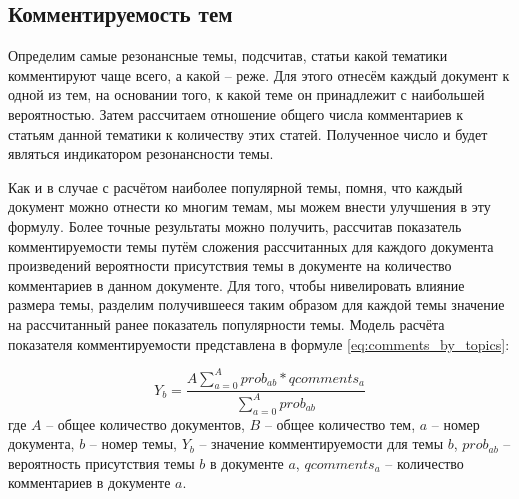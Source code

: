 \subsection{Комментируемость тем}
Определим самые резонансные темы, подсчитав, статьи какой тематики комментируют чаще всего, а какой -- реже. Для этого отнесём каждый документ к одной из тем, на основании того, к какой теме он принадлежит с наибольшей вероятностью. Затем рассчитаем отношение общего числа комментариев к статьям данной тематики к количеству этих статей. Полученное число и будет являться индикатором резонансности темы.

Как и в случае с расчётом наиболее популярной темы, помня, что каждый документ можно отнести ко многим темам, мы можем внести улучшения в эту формулу. Более точные результаты можно получить, рассчитав показатель комментируемости темы путём сложения рассчитанных для каждого документа произведений вероятности присутствия темы в документе на количество комментариев в данном документе. Для того, чтобы нивелировать влияние размера темы, разделим получившееся таким образом для каждой темы значение на рассчитанный ранее показатель популярности темы. Модель расчёта показателя комментируемости представлена в формуле \ref{eq:comments_by_topics}:

\begin{equation}\label{eq:comments_by_topics}
Y_b = \frac{A \sum \limits_{a=0}^{A}prob_{ab} * qcomments_a}{\sum_{a=0}^{A} prob_{ab}}
\end{equation}
где $A$ -- общее количество документов, $B$ -- общее количество тем, $a$ -- номер документа, $b$ -- номер темы, $Y_b$ -- значение комментируемости для темы $b$, $prob_{ab}$ -- вероятность присутствия темы $b$ в документе $a$, $qcomments_a$ -- количество комментариев в документе $a$.

